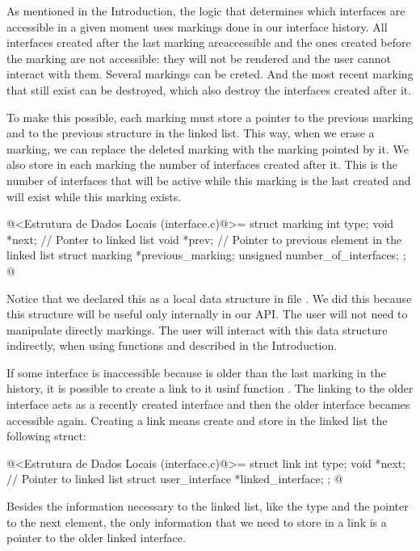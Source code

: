 
As mentioned in the Introduction, the logic that determines which
interfaces are accessible in a given moment uses markings done in our
interface history. All interfaces created after the last marking
areaccessible and the ones created before the marking are not
accessible: they will not be rendered and the user cannot interact
with them. Several markings can be creted. And the most recent marking
that still exist can be destroyed, which also destroy the interfaces
created after it.

To make this possible, each marking must store a pointer to the
previous marking and to the previous structure in the linked
list. This way, when we erase a marking, we can replace the deleted
marking with the marking pointed by it. We also store in each marking
the number of interfaces created after it. This is the number of
interfaces that will be active while this marking is the last created
and will exist while this marking exists.

\iniciocodigo
@<Estrutura de Dados Locais (interface.c)@>=
struct marking {
  int type;
  void *next; // Ponter to linked list
  void *prev; // Pointer to previous element in the linked list
  struct marking *previous_marking;
  unsigned number_of_interfaces;
};
@
\fimcodigo

Notice that we declared this as a local data structure in file
. We did this because this structure will be
useful only internally in our API. The user will not need to
manipulate directly markings. The user will interact with this data
structure indirectly, when using functions
 and
 described in the
Introduction.


If some interface is inaccessible because is older than the last
marking in the history, it is possible to create a link to it usinf
function . The linking to the older
interface acts as a recently created interface and then the older
interface becames accessible again. Creating a link means create and
store in the linked list the following struct:

\iniciocodigo
@<Estrutura de Dados Locais (interface.c)@>=
struct link{
  int type;
  void *next; // Pointer to linked list
  struct user_interface *linked_interface;
};
@
\fimcodigo

Besides the information necessary to the linked list, like the type
and the pointer to the next element, the only information that we need
to store in a link is a pointer to the older linked interface.

